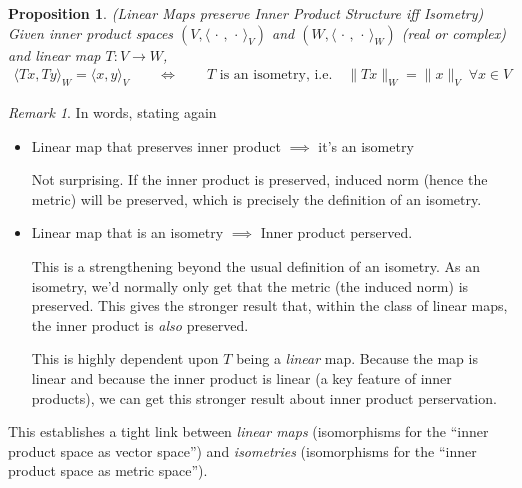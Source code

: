 \documentclass[12pt]{book}
\numberwithin{equation}{section} %
\theoremstyle{plain}
\newtheorem{prop}[thm]{Proposition}
\theoremstyle{definition}
\theoremstyle{remark}
\newtheorem*{rmk}{Remark}
\newcommand{\ra}{\rightarrow}
\begin{document}
\begin{prop}
\emph{(Linear Maps preserve Inner Product Structure iff Isometry)}
Given inner product spaces
$(V,\langle\,\cdot\,,\,\cdot\,\rangle_V)$
and
$(W,\langle\,\cdot\,,\,\cdot\,\rangle_W)$
(real or complex)
and linear map $T:V\ra W$,
\begin{align*}
  \langle Tx, Ty\rangle_W
  =
  \langle x,y\rangle_V
  \qquad\iff\qquad
  \text{$T$ is an isometry, i.e.}
  \quad
  \lVert Tx\rVert_W
  =
  \lVert x\rVert_V
  \;
  \forall x\in V
\end{align*}
\end{prop}
\begin{rmk}
In words, stating again
\begin{itemize}
  \item Linear map that preserves inner product
    $\implies$ it's an isometry

    Not surprising. If the inner product is preserved, induced norm
    (hence the metric) will be preserved, which is precisely the
    definition of an isometry.

  \item Linear map that is an isometry $\implies$ Inner product
    perserved.

    This is a strengthening beyond the usual definition of an isometry.
    As an isometry, we'd normally only get that the metric (the induced
    norm) is preserved.
    This gives the stronger result that, within the class of linear
    maps, the inner product is \emph{also} preserved.

    This is highly dependent upon $T$ being a \emph{linear} map.
    Because the map is linear and because the inner product is linear (a
    key feature of inner products), we can get this stronger result
    about inner product perservation.
\end{itemize}
This establishes a tight link between \emph{linear maps}
(isomorphisms for the ``inner product space as vector space'') and
\emph{isometries} (isomorphisms for the ``inner product space as metric
space'').
\end{rmk}
\end{document}
